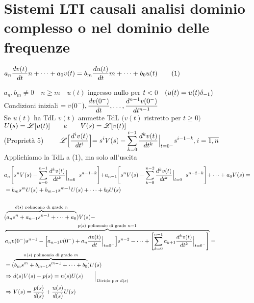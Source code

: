    \section{Sistemi LTI causali analisi dominio complesso o nel dominio delle frequenze}
   \begin{center}
      $\displaystyle a_n\frac{dv(t)}{dt}{n} + \dots + a_0v(t) = b_m\frac{du(t)}{dt}{m} + \dots + b_0u(t)\qquad(1)$
   \end{center}
      $a_n, b_m \neq 0 \quad n\ge m \quad u(t)$ ingresso nullo per $t < 0\quad (u(t) = u(t)\delta_{-1})$\\
      Condizioni iniziali $\displaystyle= v(0^-), \frac{dv(0^-)}{dt}, \dots, \frac{d^{n-1}v(0^-)}{dt^{n-1}}$\\
      Se $u(t)$ ha TdL $v(t)$ ammette TdL $\bigr(v(t)$ ristretto per $t\ge 0\bigl)$\\
      $U(s) = \mathscr{L}[u(t)]\qquad e\qquad V(s) = \mathscr{L}[v(t)]$\\
      (Proprietà 5) $\displaystyle\qquad \mathscr{L}\Bigr[\frac{d^{i}v(t)}{dt^{i}}\Bigl] = s^iV(s) - \sum_{k = 0}^{i - 1}\frac{d^{k}v(t)}{dt^{k}}\Big|_{t = 0^-}s^{i - 1 - k}, i = \overline{1,n}$\\
      Applichiamo la TdL a (1), ma solo all'uscita
      \[
         \begin{split}
            &\displaystyle a_n\Biggr[s^nV(s) - \sum_{k = 0}^{n - 1}\frac{d^{k}v(t)}{dt^{k}}\Big|_{t = 0^-}s^{n - 1 - k}\Biggl] + a_{n - 1}\Biggr[s^nV(s) - \sum_{k = 0}^{n - 2}\frac{d^{k}v(t)}{dt^{k}}\Big|_{t = 0^-}s^{n - 2 - k}\Biggl] + \dots + a_0V(s) =\\
            & = b_ms^mU(s) + b_{m - 1}s^{m - 1}U(s) + \dots + b_0U(s)\\\\
            & (\overbrace{a_ns^n + a_{n - 1}s^{n - 1} + \dots + a_0}^{d(s) \mathrm{\,\,polinomio\,\,di\,\,grado\,\,}n})V(s) -\\
            & \overbrace{a_nv(0^-)s^{n-1} - \Bigl[a_{n-1}v(0^-) + a_n\frac{dv(t)}{dt}\Big|_{t = 0^-}\Bigr]s^{n - 2} - \dots + \Biggl[\sum_{k = 0}^{n - 1}a_{k + 1}\frac{d^{k}v(t)}{dt^{k}}\Big|_{t = 0^-}\Biggr]}^{p(s)\mathrm{\,\,polinomio\,\,di\,\,grado\,\,}n-1} = \\
            & = (\overbrace{b_ms^m + b_{m - 1}s^{m - 1} + \dots + b_0}^{n(s) \mathrm{\,\,polinomio\,\,di\,\,grado\,\,}m})U(s)\\
            & \Rightarrow d(s)V(s) - p(s) = n(s)U(s)\qquad\Big|_{\mathrm{Divido\,\,per\,\,}d(s)}\\
            & \Rightarrow V(s) = \frac{p(s)}{d(s)}+ \frac{n(s)}{d(s)}U(s)
         \end{split}
      \]
